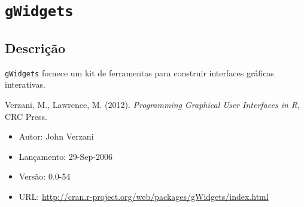 \section{\texttt{gWidgets}}


\subsection{Descrição}

\begin{frame}

  \texttt{gWidgets} fornece um kit de ferramentas para construir
  interfaces gráficas interativas.

  \vspace{\baselineskip}

  Verzani, M., Lawrence, M. (2012). \emph{Programming Graphical User
    Interfaces in R}, CRC Press.

  \begin{itemize}
  \item Autor: John Verzani
  \item Lançamento: 29-Sep-2006
  \item Versão: 0.0-54
  \item URL: \url{http://cran.r-project.org/web/packages/gWidgets/index.html}
  \end{itemize}

\end{frame}

